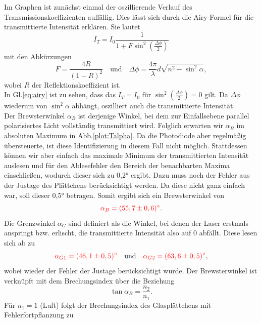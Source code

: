 Im Graphen ist zunächst einmal der oszillierende Verlauf des Transmissionskoeffizienten auffällig. Dies lässt sich durch die Airy-Formel für die transmittierte Intensität 
erklären. Sie lautet 
\begin{equation}
    I_T = I_0 \frac{1}{1+F \sin^2(\frac{\Delta \phi}{2})}  
    \label{eq:airy}
\end{equation}
mit den Abkürzungen 
\begin{equation}
    F = \frac{4R}{(1-R)^2} \quad \mathrm{ und } \quad \Delta \phi = \frac{4\pi}{\lambda}d\sqrt{n^2-\sin^2\alpha},
    \label{eq:airyPar}
\end{equation} 
wobei $R$ der Reflektionskoeffizient ist.\\
In Gl.\ref{eq:airy} ist zu sehen, dass das $I_T = I_0$ für $\sin^2(\frac{\Delta \phi}{2}) = 0$ gilt. Da $\Delta \phi$ wiederum von $\sin^2\alpha$ abhängt, oszilliert auch die 
transmittierte Intensität.\\
Der Brewsterwinkel $\alpha_B$ ist derjenige Winkel, bei dem zur Einfallsebene parallel polarisiertes Licht vollständig transmittiert wird. Folglich erwarten wir $\alpha_B$ 
im absoluten Maximum in Abb.\ref{plot:Talpha}. Da die Photodiode aber regelmäßig übersteuerte, ist diese Identifizierung in diesem Fall nicht möglich. Stattdessen können wir 
aber einfach das maximale Minimum der transmittierten Intensität auslesen und für den Ablesefehler den Bereich der benachbarten Maxima einschließen, wodurch dieser sich zu 0,2° ergibt. 
Dazu muss noch der Fehler aus der Justage des Plättchens berücksichtigt werden. Da diese nicht ganz einfach war, soll dieser 0,5° betragen. 
Somit ergibt sich ein Brewsterwinkel von 
\begin{equation*}
    \textcolor{red}{\alpha_B = (55,7 \pm 0,6)^\circ}.
\end{equation*}
Die Grenzwinkel $\alpha_G$ sind definiert als die Winkel, bei denen der Laser erstmals anspringt bzw. erlischt, die transmittierte Intensität also auf 0 abfällt. Diese lesen sich 
ab zu 
\begin{equation*}
    \textcolor{red}{\alpha_{G1} = (46,1 \pm 0,5)^\circ \quad} \mathrm{ und } \textcolor{red}{ \quad \alpha_{G2} = (63,6 \pm 0,5)^\circ},
\end{equation*}
wobei wieder der Fehler der Justage berücksichtigt wurde.
Der Brewsterwinkel ist verknüpft mit dem Brechungsindex über die Beziehung 
\begin{equation*}
    \tan\alpha_B = \frac{n_2}{n_1}.
\end{equation*}
Für $n_1 = 1$ (Luft) folgt der Brechungsindex des Glasplättchens mit Fehlerfortpflanzung zu 
